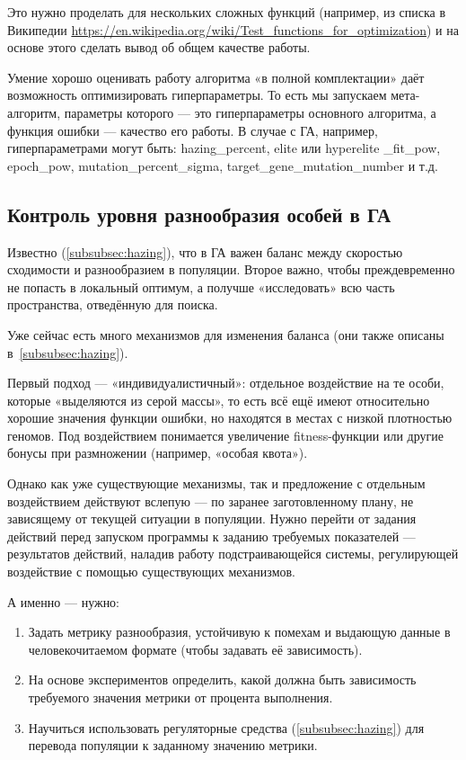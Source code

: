 Это нужно проделать для нескольких сложных функций (например, из списка в Википедии \href{https://en.wikipedia.org/wiki/Test_functions_for_optimization}{https://en.wikipedia.org/wiki/Test_functions_for_optimization})
и на основе этого сделать вывод об общем качестве работы.

Умение хорошо оценивать работу алгоритма «в полной комплектации» даёт возможность оптимизировать гиперпараметры.
То есть мы запускаем мета-алгоритм, параметры которого — это гиперпараметры основного алгоритма, а функция ошибки — качество его работы.
В случае с ГА, например, гиперпараметрами могут быть: hazing\_percent, elite или hyperelite \_fit\_pow, epoch\_pow, mutation\_percent\_sigma, target\_gene\_mutation\_number и т.д.


\subsection{Контроль уровня разнообразия особей в ГА}\label{subsec:control_GA_diversity}
Известно (\ref{subsubsec:hazing}), что в ГА важен баланс между скоростью сходимости и разнообразием в популяции.
Второе важно, чтобы преждевременно не попасть в локальный оптимум, а получше «исследовать» всю часть пространства, отведённую для поиска.

Уже сейчас есть много механизмов для изменения баланса (они также описаны в~\ref{subsubsec:hazing}).

Первый подход — «индивидуалистичный»: отдельное воздействие на те особи, которые «выделяются из серой массы»,
то есть всё ещё имеют относительно хорошие значения функции ошибки, но находятся в местах с низкой плотностью геномов.
Под воздействием понимается увеличение fitness-функции или другие бонусы при размножении (например, «особая квота»).

Однако как уже существующие механизмы, так и предложение с отдельным воздействием действуют вслепую — по заранее заготовленному плану,
не зависящему от текущей ситуации в популяции.
Нужно перейти от задания действий перед запуском программы к заданию требуемых показателей — результатов действий,
наладив работу подстраивающейся системы, регулирующей воздействие с помощью существующих механизмов.

А именно — нужно:
\begin{enumerate}
    \item Задать метрику разнообразия, устойчивую к помехам и выдающую данные в человекочитаемом формате (чтобы задавать её зависимость).
    \item На основе экспериментов определить, какой должна быть зависимость требуемого значения метрики от процента выполнения.
    \item Научиться использовать регуляторные средства (\ref{subsubsec:hazing}) для перевода популяции к заданному значению метрики.
\end{enumerate}

